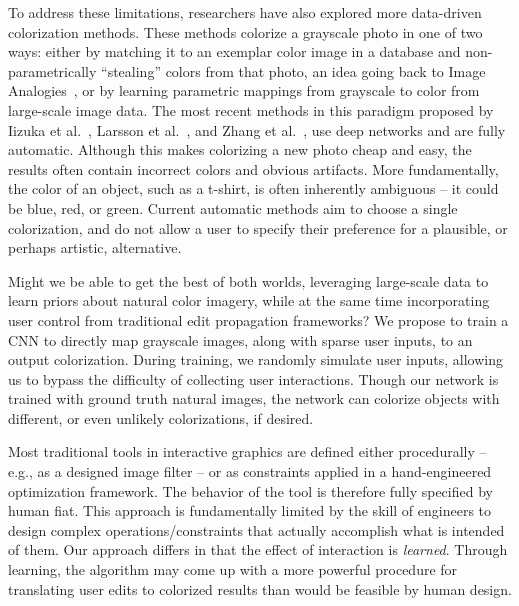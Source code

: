 \documentclass[acmtog,authorversion]{acmart}
\begin{document}
To address these limitations, researchers have also explored more data-driven colorization methods. These methods colorize a grayscale photo in one of two ways: either by matching it to an exemplar color image in a database and non-parametrically ``stealing'' colors from that photo, an idea going back to Image Analogies~\citep{hertzmann2001image}, or by learning parametric mappings from grayscale to color from large-scale image data.
The most recent methods in this paradigm proposed by Iizuka et al.~, Larsson et al.~, and Zhang et al.~, use deep networks and are fully automatic. Although this makes colorizing a new photo cheap and easy, the results often contain incorrect colors and obvious artifacts. More fundamentally, the color of an object, such as a t-shirt, is often inherently ambiguous -- it could be blue, red, or green. Current automatic methods aim to choose a single colorization, and do not allow a user to specify their preference for a plausible, or perhaps artistic, alternative.

Might we be able to get the best of both worlds, leveraging large-scale data to learn priors about natural color imagery, while at the same time incorporating user control from traditional edit propagation frameworks? We propose to train a CNN to directly map grayscale images, along with sparse user inputs, to an output colorization. During training, we randomly simulate user inputs, allowing us to bypass the difficulty of collecting user interactions. Though our network is trained with ground truth natural images, the network can colorize objects with different, or even unlikely colorizations, if desired.

Most traditional tools in interactive graphics are defined either procedurally -- e.g., as a designed image filter -- or as constraints applied in a hand-engineered optimization framework. The behavior of the tool is therefore fully specified by human fiat. This approach is fundamentally limited by the skill of engineers to design complex operations/constraints that actually accomplish what is intended of them. Our approach differs in that the effect of interaction is \emph{learned}. Through learning, the algorithm may come up with a more powerful procedure for translating user edits to colorized results than would be feasible by human design.
\end{document}
